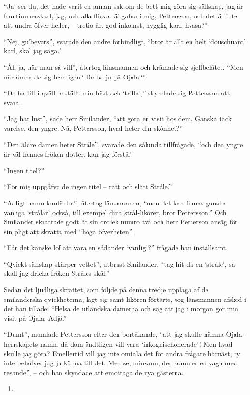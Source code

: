 ``Ja, ser du, det hade varit en annan sak om de bett mig göra sig
sällskap, jag är fruntimmerskarl, jag, och alla flickor ä' galna i mig,
Pettersson, och det är inte att undra öfver heller, -- tretio år, god
inkomst, hygglig karl, hvasa?''

``Nej, gu'bevars'', svarade den andre förbindligt, ``bror är allt en
helt `douschuant' karl, ska' jag säga.''

``Åh ja, när man så vill'', återtog länsmannen och kråmade sig
sjelfbelåtet. ``Men när ämna de sig hem igen? De bo ju på Ojala?'':

``De ha till i qväll beställt min häst och `trilla','' skyndade sig
Pettersson att svara.

``Jag har lust'', sade herr Smilander, ``att göra en visit hos dem.
Ganska täck varelse, den yngre. Nå, Pettersson, hvad heter din
skönhet?''

``Den äldre damen heter Stråle'', svarade den sålunda tillfrågade, ``och
den yngre är väl hennes fröken dotter, kan jag förstå.''

``Ingen titel?''

``För mig uppgåfvo de ingen titel -- rätt och slätt Stråle.''

``Adligt namn kantänka'', återtog länsmannen, ``men det kan finnas
ganska vanliga `strålar' också, till exempel dina strål-likörer, bror
Pettersson.'' Och Smilander skrattade godt åt sin ordlek numro två och
herr Petterson ansåg för sin pligt att skratta med ``höga öfverheten''.

``Får det kanske lof att vara en sådander `vanlig'?'' frågade han
inställsamt.

``Qvickt sällskap skärper vettet'', utbrast Smilander, ``tag hit då en
`stråle', så skall jag dricka fröken Stråles skål.''

Sedan det ljudliga skrattet, som följde på denna tredje upplaga af de
smilanderska qvickheterna, lagt sig samt likören förtärts, tog
länsmannen afsked i det han tillade: ``Helsa de utländska damerna och
säg att jag i morgon gör min visit på Ojala. Adjö.''

``Dumt'', mumlade Pettersson efter den bortåkande, ``att jag skulle
nämna Ojala-herrskapets namn, då dom ändtligen vill vara
`inkognischonerade'! Men hvad skulle jag göra? Emellertid vill jag inte
omtala det för andra frågare härnäst, ty inte behöfver jag ju känna till
det. Men se, minsann, der kommer en vagn med resande'', -- och han
skyndade att emottaga de nya gästerna.

\begin{enumerate}
\def\labelenumi{\arabic{enumi}.}
\setcounter{enumi}{10}
\tightlist
\item
\end{enumerate}

